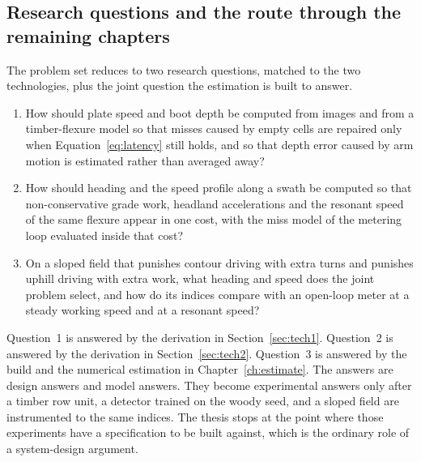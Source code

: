 \subsection{Research questions and the route through the remaining chapters}

The problem set reduces to two research questions, matched to the two technologies, plus the joint question the estimation is built to answer.

\begin{enumerate}[label=\textbf{Q\arabic*.}]
\item How should plate speed and boot depth be computed from images and from a timber-flexure model so that misses caused by empty cells are repaired only when Equation~\eqref{eq:latency} still holds, and so that depth error caused by arm motion is estimated rather than averaged away?
\item How should heading and the speed profile along a swath be computed so that non-conservative grade work, headland accelerations and the resonant speed of the same flexure appear in one cost, with the miss model of the metering loop evaluated inside that cost?
\item On a sloped field that punishes contour driving with extra turns and punishes uphill driving with extra work, what heading and speed does the joint problem select, and how do its indices compare with an open-loop meter at a steady working speed and at a resonant speed?
\end{enumerate}

Question~1 is answered by the derivation in Section~\ref{sec:tech1}. Question~2 is answered by the derivation in Section~\ref{sec:tech2}. Question~3 is answered by the build and the numerical estimation in Chapter~\ref{ch:estimate}. The answers are design answers and model answers. They become experimental answers only after a timber row unit, a detector trained on the woody seed, and a sloped field are instrumented to the same indices. The thesis stops at the point where those experiments have a specification to be built against, which is the ordinary role of a system-design argument.


